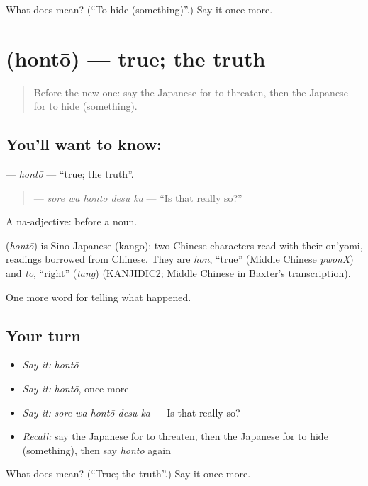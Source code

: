 \begin{tcolorbox}[breakable,colback=teal!4,colframe=teal!35!black,title={Before you move on}]
What does  mean? (\textquotedblleft{}To hide (something)\textquotedblright{}.) Say it once more.
\end{tcolorbox}
\section[\texorpdfstring{\ja{ほんとう} (hontō)}{ほんとう (hontō)}]{ (hontō) — true; the truth}

\label{lesson:JA-C272-hontou}



\begin{quote}
Before the new one: say the Japanese for to threaten, then the Japanese for to hide (something).
\end{quote}

\subsection*{You'll want to know: }
\textbf{} — \emph{hontō} — \textquotedblleft{}true; the truth\textquotedblright{}.

\begin{quote}
\textbf{ } — \emph{sore wa hontō desu ka} — \textquotedblleft{}Is that really so?\textquotedblright{}
\end{quote}

A na-adjective:  before a noun.

\begin{cousinweb}
\textbf{} (\emph{hontō}) is Sino-Japanese (kango): two Chinese characters read with their on'yomi, readings borrowed from Chinese. They are \emph{hon}, \textquotedblleft{}true\textquotedblright{} (Middle Chinese \emph{pwonX}) and \emph{tō}, \textquotedblleft{}right\textquotedblright{} (\emph{tang}) (KANJIDIC2; Middle Chinese in Baxter's transcription).
\end{cousinweb}

\begin{grammarlens}[title={What you've built}]
One more word for telling what happened.
\end{grammarlens}

\subsection*{Your turn}
\begin{itemize}
\raggedright
  \item \emph{Say it:} \emph{hontō}
  \item \emph{Say it:} \emph{hontō}, once more
  \item \emph{Say it:} \emph{sore wa hontō desu ka} — Is that really so?
  \item \emph{Recall:} say the Japanese for to threaten, then the Japanese for to hide (something), then say \emph{hontō} again
\end{itemize}

\begin{tcolorbox}[breakable,colback=teal!4,colframe=teal!35!black,title={Before you move on}]
What does  mean? (\textquotedblleft{}True; the truth\textquotedblright{}.) Say it once more.
\end{tcolorbox}
